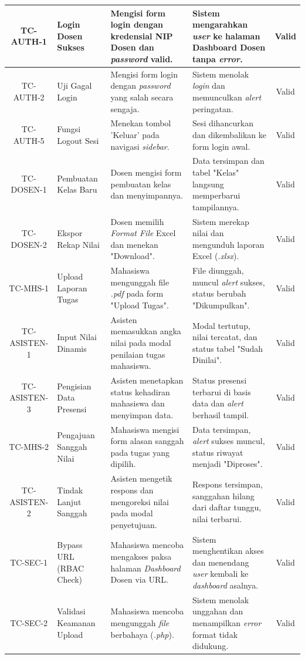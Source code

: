 \documentclass[12pt,a4paper,twoside]{report}
\begin{document}
\begin{longtable}{|c|p{3.5cm}|p{4cm}|p{4cm}|c|}
TC-AUTH-1 & Login Dosen Sukses & Mengisi form login dengan kredensial NIP Dosen dan \textit{password} valid. & Sistem mengarahkan \textit{user} ke halaman Dashboard Dosen tanpa \textit{error}. & Valid \\
\hline
TC-AUTH-2 & Uji Gagal Login & Mengisi form login dengan \textit{password} yang salah secara sengaja. & Sistem menolak \textit{login} dan memunculkan \textit{alert} peringatan. & Valid \\
\hline
TC-AUTH-5 & Fungsi Logout Sesi & Menekan tombol 'Keluar' pada navigasi \textit{sidebar}. & Sesi dihancurkan dan dikembalikan ke form login awal. & Valid \\
\hline
TC-DOSEN-1 & Pembuatan Kelas Baru & Dosen mengisi form pembuatan kelas dan menyimpannya. & Data tersimpan dan tabel "Kelas" langsung memperbarui tampilannya. & Valid \\
\hline
TC-DOSEN-2 & Ekspor Rekap Nilai & Dosen memilih \textit{Format File} Excel dan menekan "Download". & Sistem merekap nilai dan mengunduh laporan Excel (\textit{.xlsx}). & Valid \\
\hline
TC-MHS-1 & Upload Laporan Tugas & Mahasiswa mengunggah file \textit{.pdf} pada form "Upload Tugas". & File diunggah, muncul \textit{alert} sukses, status berubah "Dikumpulkan". & Valid \\
\hline
TC-ASISTEN-1 & Input Nilai Dinamis & Asisten memasukkan angka nilai pada modal penilaian tugas mahasiswa. & Modal tertutup, nilai tercatat, dan status tabel "Sudah Dinilai". & Valid \\
\hline
TC-ASISTEN-3 & Pengisian Data Presensi & Asisten menetapkan status kehadiran mahasiswa dan menyimpan data. & Status presensi terbarui di basis data dan \textit{alert} berhasil tampil. & Valid \\
\hline
TC-MHS-2 & Pengajuan Sanggah Nilai & Mahasiswa mengisi form alasan sanggah pada tugas yang dipilih. & Data tersimpan, \textit{alert} sukses muncul, status riwayat menjadi "Diproses". & Valid \\
\hline
TC-ASISTEN-2 & Tindak Lanjut Sanggah & Asisten mengetik respons dan mengoreksi nilai pada modal penyetujuan. & Respons tersimpan, sanggahan hilang dari daftar tunggu, nilai terbarui. & Valid \\
\hline
TC-SEC-1 & Bypass URL (RBAC Check) & Mahasiswa mencoba mengakses paksa halaman \textit{Dashboard} Dosen via URL. & Sistem menghentikan akses dan menendang \textit{user} kembali ke \textit{dashboard} asalnya. & Valid \\
\hline
TC-SEC-2 & Validasi Keamanan Upload & Mahasiswa mencoba mengunggah \textit{file} berbahaya (\textit{.php}). & Sistem menolak unggahan dan menampilkan \textit{error} format tidak didukung. & Valid \\

\end{longtable}
\end{document}
